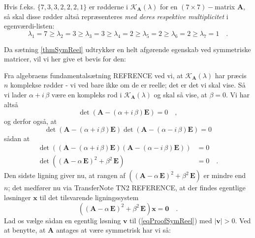 \begin{info}
Hvis f.eks. $\{7, 3,3, 2, 2,2,1\}$ er rødderne i $\mathcal{K}_{\mathbf{A}}(\lambda)$ for en $(7 \times 7)-$matrix $\mathbf{A}$, så skal disse rødder altså repræsenteres {\em{med deres respektive multiplicitet}} i egenværdi-listen:
\begin{equation*}
\lambda_{1} = 7 \geq \lambda_{2} = 3 \geq \lambda_{3} = 3 \geq \lambda_{4} = 2 \geq \lambda_{5} = 2 \geq \lambda_{6} = 2 \geq \lambda_{7} = 1 \quad.
\end{equation*}
\end{info}
Da sætning \ref{thmSymReel} udtrykker en helt afgørende egenskab ved symmetriske matricer, vil vi her give et bevis for den:
\begin{bevis}
Fra algebraens fundamentalsætning REFRENCE ved vi, at $\mathcal{K}_{\mathbf{A}}(\lambda)$ har præcis $n$ komplekse rødder - vi ved bare ikke om de er reelle; det er det vi skal vise. Så vi lader $\alpha + i\,\beta$ være en kompleks rod i $\mathcal{K}_{\mathbf{A}}(\lambda)$ og skal så vise, at $\beta = 0$.
Vi har altså
\begin{equation}
\det\left(\mathbf{A} - (\alpha + i\,\beta)\mathbf{E}\right) = 0 \quad ,
\end{equation}
og derfor også, at
\begin{equation}
\det\left(\mathbf{A} - (\alpha + i\,\beta)\mathbf{E} \right)\det\left(\mathbf{A} - (\alpha - i\,\beta)\mathbf{E} \right) = 0
\end{equation}
sådan at
\begin{equation}
\begin{aligned}
\det\left(\left(\mathbf{A} - (\alpha + i\,\beta)\mathbf{E} \right)\left(\mathbf{A} - (\alpha - i\,\beta)\mathbf{E} \right)\right) &= 0 \\
\det\left(\left(\mathbf{A} - \alpha\,\mathbf{E} \right)^{2} + \beta^{2}\,\mathbf{E} \right) &= 0 \quad .
\end{aligned}
\end{equation}
Den sidste ligning giver nu, at rangen af  $\left(\left(\mathbf{A} - \alpha\,\mathbf{E} \right)^{2} + \beta^{2}\,\mathbf{E} \right)$ er mindre end $n$; det medfører nu via TransferNote TN2 REFERENCE, at der findes egentlige løsninger $\mathbf{x}$ til det tilsvarende ligningssystem
\begin{equation} \label{eqProofSymReel}
\left(\left(\mathbf{A} - \alpha\,\mathbf{E} \right)^{2} + \beta^{2}\,\mathbf{E} \right)\mathbf{x} = \mathbf{0} \quad .
\end{equation}
Lad os vælge sådan en egentlig løsning $\mathbf{v}$ til (\ref{eqProofSymReel}) med $\vert \mathbf{v} \vert > 0$. Ved at benytte, at $\mathbf{A}$ antages at være symmetrisk har vi så:

\end{bevis}
